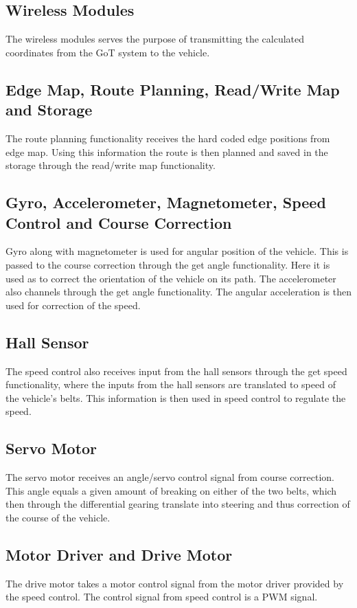 \subsection{Wireless Modules}
The wireless modules serves the purpose of transmitting the calculated coordinates from the GoT system to the vehicle.

\subsection{Edge Map, Route Planning, Read/Write Map and Storage}
The route planning functionality receives the hard coded edge positions from edge map. Using this information the route is then planned and saved in the storage through the read/write map functionality.

\subsection{Gyro, Accelerometer, Magnetometer, Speed Control and Course Correction}
Gyro along with magnetometer is used for angular position of the vehicle. This is passed to the course correction through the get angle functionality. Here it is used as to correct the orientation of the vehicle on its path. The accelerometer also channels through the get angle functionality. The angular acceleration is then used for correction of the speed.

\subsection{Hall Sensor}
The speed control also receives input from the hall sensors through the get speed functionality, where the inputs from the hall sensors are translated to speed of the vehicle's belts. This information is then used in speed control to regulate the speed.

\subsection{Servo Motor}
The servo motor receives an angle/servo control signal from course correction. This angle equals a given amount of breaking on either of the two belts, which then through the differential gearing translate into steering and thus correction of the course of the vehicle.

\subsection{Motor Driver and Drive Motor}
The drive motor takes a motor control signal from the motor driver provided by the speed control. The control signal from speed control is a PWM signal.